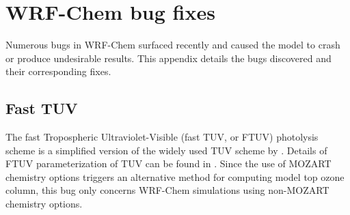 \chapter{WRF-Chem bug fixes} \label{apdx:bug}

\ifpdf
    \graphicspath{{Appendix/figures/PNG/}{Appendix/figures/PDF/}{Appendix/figures/}}
\else
    \graphicspath{{Appendix/figures/EPS/}{Appendix/figures/}}
\fi

Numerous bugs in WRF-Chem surfaced recently and caused the model to crash or produce undesirable results. This appendix details the bugs discovered and their corresponding fixes.

\section{Fast TUV}\label{a-sec:bug/ftuv}

The fast Tropospheric Ultraviolet-Visible (fast TUV, or FTUV) photolysis scheme is a simplified version of the widely used TUV scheme by \citet{Madronich:1987uq}. Details of FTUV parameterization of TUV can be found in \citet{Tie:2003ve}. Since the use of MOZART chemistry options triggers an alternative method for computing model top ozone column, this bug only concerns WRF-Chem simulations using non-MOZART chemistry options.

